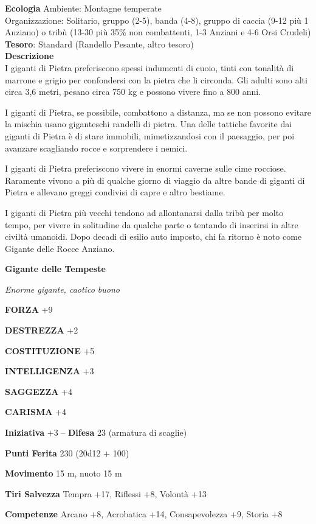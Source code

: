 \begin{multicols}{2}
\textbf{Ecologia}
Ambiente: Montagne temperate\\
Organizzazione: Solitario, gruppo (2-5), banda (4-8), gruppo di caccia (9-12 più 1 Anziano) o tribù (13-30 più 35\% non combattenti, 1-3 Anziani e 4-6 Orsi Crudeli)\\
\textbf{Tesoro}: Standard (Randello Pesante, altro tesoro)\\
\textbf{Descrizione}\\
I giganti di Pietra preferiscono spessi indumenti di cuoio, tinti con tonalità di marrone e grigio per confondersi con la pietra che li circonda. Gli adulti sono alti circa 3,6 metri, pesano circa 750 kg e possono vivere fino a 800 anni.

I giganti di Pietra, se possibile, combattono a distanza, ma se non possono evitare la mischia usano giganteschi randelli di pietra. Una delle tattiche favorite dai giganti di Pietra è di stare immobili, mimetizzandosi con il paesaggio, per poi avanzare scagliando rocce e sorprendere i nemici.

I giganti di Pietra preferiscono vivere in enormi caverne sulle cime rocciose. Raramente vivono a più di qualche giorno di viaggio da altre bande di giganti di Pietra e allevano greggi condivisi di capre e altro bestiame.

I giganti di Pietra più vecchi tendono ad allontanarsi dalla tribù per molto tempo, per vivere in solitudine da qualche parte o tentando di inserirsi in altre civiltà umanoidi. Dopo decadi di esilio auto imposto, chi fa ritorno è noto come Gigante delle Rocce Anziano.


\medskip{}\textbf{Gigante delle Tempeste}

\textit{Enorme gigante, caotico buono}

\textbf{FORZA} +9

\textbf{DESTREZZA} +2

\textbf{COSTITUZIONE} +5

\textbf{INTELLIGENZA} +3

\textbf{SAGGEZZA} +4

\textbf{CARISMA} +4

\textbf{Iniziativa} +3 -- \textbf{Difesa} 23 (armatura di scaglie)

\textbf{Punti Ferita} 230 (20d12 + 100)

\textbf{Movimento} 15 m, nuoto 15 m

\textbf{Tiri Salvezza} Tempra +17, Riflessi +8, Volontà +13

\textbf{Competenze} Arcano +8, Acrobatica +14, Consapevolezza +9, Storia +8


\end{multicols}
